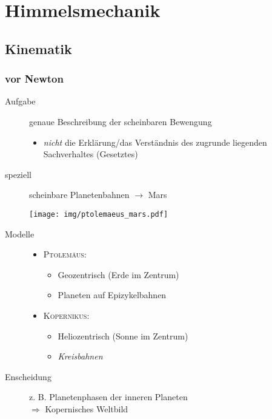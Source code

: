 \chapter{Himmelsmechanik}
\section{Kinematik}
\subsection*{vor Newton}
\begin{description}
    \item[Aufgabe] genaue Beschreibung der scheinbaren Bewengung
        \begin{itemize}
            \item \emph{nicht} die Erklärung/das Verständnis des zugrunde
                  liegenden Sachverhaltes (Gesetztes)
        \end{itemize}
    \item[speziell] scheinbare Planetenbahnen $\rightarrow$ Mars
        \begin{center}
            \texttt{[image: img/ptolemaeus\_mars.pdf]}
        \end{center}
    \item[Modelle]
        \begin{itemize}
            \item \textsc{Ptolemäus:}
                \begin{itemize}
                    \item Geozentrisch (Erde im Zentrum)
                    \item Planeten auf Epizykelbahnen
                \end{itemize}
            \item \textsc{Kopernikus:}
                \begin{itemize}
                    \item Heliozentrisch (Sonne im Zentrum)
                    \item \emph{Kreisbahnen}
                \end{itemize}
        \end{itemize}
    \item[Enscheidung] z. B. Planetenphasen der inneren Planeten\\
        $\Rightarrow$ Kopernisches Weltbild
\end{description}
